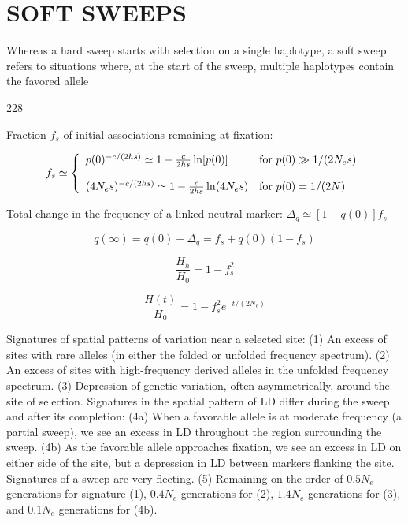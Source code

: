\documentclass{article}
\begin{document}
\section{SOFT SWEEPS}
Whereas a hard sweep starts with selection on a single haplotype, a soft sweep refers to situations where, at the start of the sweep, multiple haplotypes contain the favored allele

228

Fraction  $ f_{s} $ of initial associations remaining at fixation:

\begin{equation}
f_{s}\simeq\left\{\begin{array}{l l}{p(0)^{-c/(2h s)}\simeq1-\frac{c}{2h s}\ln[p(0)]}&{\mathrm{f o r~}p(0)\gg1/(2N_{e}s)}\\ {}&{}\\ {(4N_{e}s)^{-c/(2h s)}\simeq1-\frac{c}{2h s}\ln(4N_{e}s)}&{\mathrm{f o r~}p(0)=1/(2N)}\\ \end{array}\right.
\end{equation}

Total change in the frequency of a linked neutral marker:  $ \Delta_q \simeq [1 - q(0)] f_s $

\begin{equation}
q(\infty)=q(0)+\Delta_{q}=f_{s}+q(0)(1-f_{s})
\end{equation}

\begin{equation}
\frac{H_{h}}{H_{0}}=1-f_{s}^{2}
\end{equation}

\begin{equation}
\frac{H(t)}{H_{0}}=1-f_{s}^{2}e^{-t/(2N_{e})}
\end{equation}

Signatures of spatial patterns of variation near a selected site:
(1) An excess of sites with rare alleles (in either the folded or unfolded frequency spectrum).
(2) An excess of sites with high-frequency derived alleles in the unfolded frequency spectrum.
(3) Depression of genetic variation, often asymmetrically, around the site of selection.
Signatures in the spatial pattern of LD differ during the sweep and after its completion:
(4a) When a favorable allele is at moderate frequency (a partial sweep), we see an excess in LD throughout the region surrounding the sweep.
(4b) As the favorable allele approaches fixation, we see an excess in LD on either side of the site, but a depression in LD between markers flanking the site.
Signatures of a sweep are very fleeting.
(5) Remaining on the order of  $ 0.5N_{e} $ generations for signature (1),  $ 0.4N_{e} $ generations for (2),  $ 1.4N_{e} $ generations for (3), and  $ 0.1N_{e} $ generations for (4b).
\end{document}
